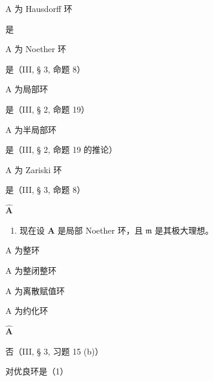A 为 Hausdorff 环

是

A 为 Noether 环

是（III, § 3, 命题 8）

A 为局部环

是（III, § 2, 命题 19）

A 为半局部环

是（III, § 2, 命题 19 的推论）

A 为 Zariski 环

是（III, § 3, 命题 8）

\textbf{\(\hat{\mathbf{A}}\)}\par

\begin{enumerate}
\def\labelenumi{(\alph{enumi})}
\setcounter{enumi}{1}
\tightlist
\item
  现在设 \(\mathbf{A}\) 是局部 Noether 环，且 \(\mathfrak{m}\) 是其极大理想。
\end{enumerate}

A 为整环

A 为整闭整环

A 为离散赋值环

A 为约化环

\textbf{\(\hat{\mathbf{A}}\)}\par

否（III, § 3, 习题 15 (b)）

对优良环是（1）


